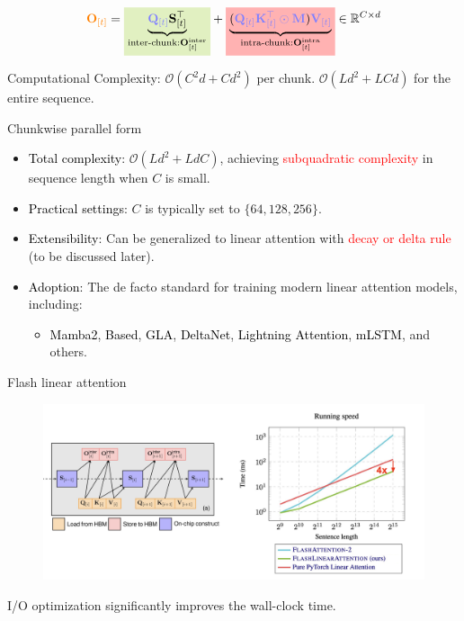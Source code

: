 \begin{frame}{}
    
    \vspace{-3mm}
    \begin{align*}
        {\color{orange}\mathbf{O}_{[t]}} = \colorbox{yellowgreen!30}{$\underbrace{{\color{blue!50}\mathbf{Q}_{[t]}}\mathbf{S}_{[t]}^\top}_{\text{inter-chunk}:\mathbf{O}_{[t]}^{\text{inter}}}$} + \colorbox{red!30}{$\underbrace{({\color{blue!50}\mathbf{Q}_{[t]}\mathbf{K}_{[t]}^\top \odot \mathbf{M}}){\color{blue!50}\mathbf{V}_{[t]}}}_{\text{intra-chunk}:\mathbf{O}_{[t]}^{\text{intra}}}$} \in \mathbb{R}^{C\times d}
    \end{align*}

    Computational Complexity: $\mathcal{O}(C^2d+Cd^2)$ per chunk. $\mathcal{O}(Ld^2+LCd)$ for the entire sequence.
\end{frame}
\begin{frame}{Chunkwise parallel form}
    \begin{itemize}
        \item {\textcolor{black}{Total complexity}}: $\mathcal{O}(Ld^2 + LdC)$, achieving {\textcolor{red}{subquadratic complexity}} in sequence length when $C$ is small.
        \item {\textcolor{black}{Practical settings}}: $C$ is typically set to $\{64, 128, 256\}$.
        \item {\textcolor{black}{Extensibility}}: Can be generalized to linear attention with {\textcolor{red}{decay or delta rule}} (to be discussed later).
        \item {\textcolor{black}{Adoption}}: The {\color{red}de facto standard} for {\color{red}training modern linear attention models}, including:
        \begin{itemize}
            \item {\textcolor{black}{Mamba2}}, {\textcolor{black}{Based}}, {\textcolor{black}{GLA}}, {\textcolor{black}{DeltaNet}}, {\textcolor{black}{Lightning Attention}}, {\textcolor{black}{mLSTM}}, and others.
        \end{itemize}
    \end{itemize}
\end{frame}

\begin{frame}{Flash linear attention}
    \begin{figure}
        \centering
        \includegraphics[width=.9\linewidth]{figure/fla-speed.png}
    \end{figure}
    \vspace{2mm} 
    I/O optimization significantly improves the wall-clock time.
\end{frame}

